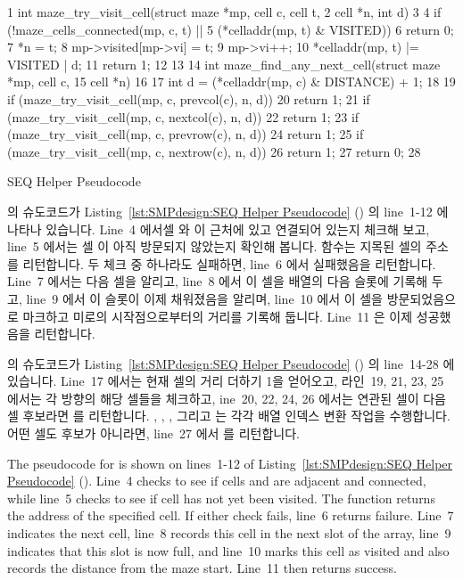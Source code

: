 \begin{listing}[tbp]
{ \scriptsize
\begin{verbbox}
  1 int maze_try_visit_cell(struct maze *mp, cell c, cell t,
  2                         cell *n, int d)
  3 {
  4   if (!maze_cells_connected(mp, c, t) ||
  5       (*celladdr(mp, t) & VISITED))
  6     return 0;
  7   *n = t;
  8   mp->visited[mp->vi] = t;
  9   mp->vi++;
 10   *celladdr(mp, t) |= VISITED | d;
 11   return 1;
 12 }
 13 
 14 int maze_find_any_next_cell(struct maze *mp, cell c,
 15                             cell *n)
 16 {
 17   int d = (*celladdr(mp, c) & DISTANCE) + 1;
 18 
 19   if (maze_try_visit_cell(mp, c, prevcol(c), n, d))
 20     return 1;
 21   if (maze_try_visit_cell(mp, c, nextcol(c), n, d))
 22     return 1;
 23   if (maze_try_visit_cell(mp, c, prevrow(c), n, d))
 24     return 1;
 25   if (maze_try_visit_cell(mp, c, nextrow(c), n, d))
 26     return 1;
 27   return 0;
 28 }
\end{verbbox}
}
\centering
\theverbbox
\caption{SEQ Helper Pseudocode}
\label{lst:SMPdesign:SEQ Helper Pseudocode}
\end{listing}

 의 슈도코드가
Listing~\ref{lst:SMPdesign:SEQ Helper Pseudocode}
() 의 line~1-12 에 나타나
있습니다.
Line~4 에서셀  와  이 근처에 있고 연결되어 있는지 체크해 보고,
line~5 에서는 셀  이 아직 방문되지 않았는지 확인해 봅니다.
 함수는 지목된 셀의 주소를 리턴합니다.
두 체크 중 하나라도 실패하면, line~6 에서 실패했음을 리턴합니다.
Line~7 에서는 다음 셀을 알리고, line~8 에서 이 셀을  배열의
다음 슬롯에 기록해 두고, line~9 에서 이 슬롯이 이제 채워졌음을 알리며, line~10
에서 이 셀을 방문되었음으로 마크하고 미로의 시작점으로부터의 거리를 기록해
둡니다.
Line~11 은 이제 성공했음을 리턴합니다.

 의 슈도코드가
Listing~\ref{lst:SMPdesign:SEQ Helper Pseudocode}
() 의 line~14-28 에 있습니다.
Line~17 에서는 현재 셀의 거리 더하기 1을 얻어오고, 라인~19, 21, 23, 25 에서는
각 방향의 해당 셀들을 체크하고, ine~20, 22, 24, 26 에서는 연관된 셀이 다음 셀
후보라면  를 리턴합니다.
, , , 그리고  는 각각
배열 인덱스 변환 작업을 수행합니다.
어떤 셀도 후보가 아니라면, line~27 에서  를 리턴합니다.
\iffalse

The pseudocode for  is shown on lines~1-12
of Listing~\ref{lst:SMPdesign:SEQ Helper Pseudocode}
().
Line~4 checks to see if cells  and  are adjacent and connected,
while line~5 checks to see if cell  has not yet been visited.
The  function returns the address of the specified cell.
If either check fails, line~6 returns failure.
Line~7 indicates the next cell, line~8 records this cell in the next
slot of the  array, line~9 indicates that this slot
is now full, and line~10 marks this cell as visited and also records
the distance from the maze start.  Line~11 then returns success.

